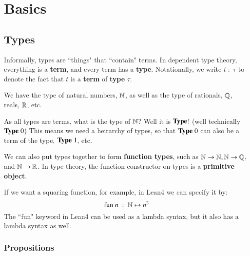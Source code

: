 %
%
%
\chapter{Basics}
\label{Basic} %



\section{Types}

Informally, types are ``things" that ``contain" terms. In dependent type theory, everything is a \textbf{term}, and every term has a \textbf{type}. Notationally, we write $t\;:\;\tau$ to denote the fact that $t$ is a \textbf{term} of \textbf{type} $\tau$.

\begin{eg}
    We have the type of natural numbers, $\mathbb N$, as well as the type of rationals, $\mathbb Q$, reals, $\mathbb R$, etc.
\end{eg}

As all types are terms, what is the type of $\mathbb N$? Well it is $\normalfont\textbf{Type}$! (well technically $\normalfont\textbf{Type}\;0$) This means we need a heirarchy of types, so that $\normalfont\textbf{Type}\;0$ can also be a term of the type, $\normalfont\textbf{Type}\;1$, etc. 

We can also put types together to form \textbf{function types}, such as $\mathbb N\rightarrow \mathbb N, \mathbb N\rightarrow \mathbb Q$, and $\mathbb N\rightarrow \mathbb R$. In type theory, the function constructor on types is a \textbf{primitive object}. 

\begin{eg}
    If we want a squaring function, for example, in Lean4 we can specify it by:
    \begin{equation*}
        \text{fun}\;n\;:\;\mathbb N\mapsto n^2
    \end{equation*}
    The ``fun" keyword in Lean4 can be used as a lambda syntax, but it also has a lambda syntax as well.
\end{eg}


\subsection{Propositions}

